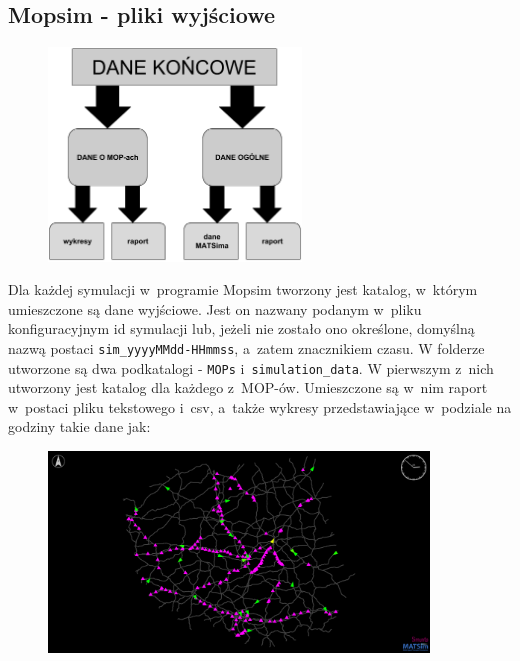 \subsection{Mopsim - pliki wyjściowe}
    \begin{figure}[h]
        \centering
        \includegraphics[width=0.6\textwidth]{images/mopsim/dane-wyjsciowe.png}
    \end{figure}
Dla każdej symulacji w~programie Mopsim tworzony jest katalog, w~którym umieszczone są dane wyjściowe. Jest on nazwany podanym w~pliku konfiguracyjnym id symulacji lub, jeżeli nie zostało ono określone, domyślną nazwą postaci \texttt{sim\_yyyyMMdd-HHmmss}, a~zatem znacznikiem czasu. W folderze utworzone są dwa podkatalogi - \texttt{MOPs} i~\texttt{simulation\_data}. W pierwszym z~nich utworzony jest katalog dla każdego z~MOP-ów. Umieszczone są w~nim raport w~postaci pliku tekstowego i~csv, a~także wykresy przedstawiające w~podziale na godziny takie dane jak:
    \begin{figure}[!b]
        \centering
        \includegraphics[width=0.9\textwidth]{images/mopsim/sim-via.png}
    \end{figure}
